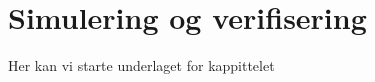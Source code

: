 \chapter{Simulering og verifisering}
\thispagestyle{fancy}
Her kan vi starte underlaget for kappittelet
